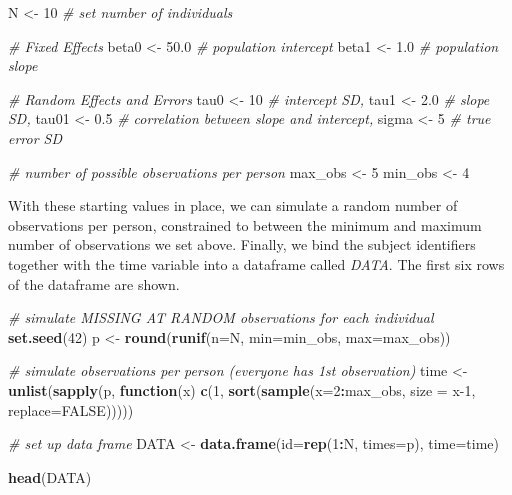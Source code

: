 \documentclass[
]{article}
\newenvironment{Shaded}{\begin{snugshade}}{\end{snugshade}}
\newcommand{\AttributeTok}[1]{\textcolor[rgb]{0.13,0.29,0.53}{#1}}
\newcommand{\CommentTok}[1]{\textcolor[rgb]{0.56,0.35,0.01}{\textit{#1}}}
\newcommand{\ConstantTok}[1]{\textcolor[rgb]{0.56,0.35,0.01}{#1}}
\newcommand{\ControlFlowTok}[1]{\textcolor[rgb]{0.13,0.29,0.53}{\textbf{#1}}}
\newcommand{\DecValTok}[1]{\textcolor[rgb]{0.00,0.00,0.81}{#1}}
\newcommand{\FloatTok}[1]{\textcolor[rgb]{0.00,0.00,0.81}{#1}}
\newcommand{\FunctionTok}[1]{\textcolor[rgb]{0.13,0.29,0.53}{\textbf{#1}}}
\newcommand{\NormalTok}[1]{#1}
\newcommand{\OtherTok}[1]{\textcolor[rgb]{0.56,0.35,0.01}{#1}}
\newcommand{\SpecialCharTok}[1]{\textcolor[rgb]{0.81,0.36,0.00}{\textbf{#1}}}
\begin{document}
\begin{Shaded}
\begin{Highlighting}[]
\NormalTok{N }\OtherTok{\textless{}{-}} \DecValTok{10} \CommentTok{\# set number of individuals}

\CommentTok{\# Fixed Effects}
\NormalTok{beta0 }\OtherTok{\textless{}{-}} \FloatTok{50.0} \CommentTok{\# population intercept }
\NormalTok{beta1 }\OtherTok{\textless{}{-}} \FloatTok{1.0}  \CommentTok{\# population slope}

\CommentTok{\# Random Effects and Errors}
\NormalTok{tau0  }\OtherTok{\textless{}{-}} \DecValTok{10} \CommentTok{\# intercept SD, }
\NormalTok{tau1  }\OtherTok{\textless{}{-}} \FloatTok{2.0} \CommentTok{\# slope SD, }
\NormalTok{tau01 }\OtherTok{\textless{}{-}} \FloatTok{0.5} \CommentTok{\# correlation between slope and intercept,}
\NormalTok{sigma }\OtherTok{\textless{}{-}} \DecValTok{5} \CommentTok{\# true error SD}


\CommentTok{\# number of possible observations per person}
\NormalTok{max\_obs }\OtherTok{\textless{}{-}} \DecValTok{5}
\NormalTok{min\_obs }\OtherTok{\textless{}{-}} \DecValTok{4}
\end{Highlighting}
\end{Shaded}

With these starting values in place, we can simulate a random number of
observations per person, constrained to between the minimum and maximum
number of observations we set above. Finally, we bind the subject
identifiers together with the time variable into a dataframe called
\emph{DATA}. The first six rows of the dataframe are shown.

\begin{Shaded}
\begin{Highlighting}[]
\CommentTok{\# simulate MISSING AT RANDOM observations for each individual}
\FunctionTok{set.seed}\NormalTok{(}\DecValTok{42}\NormalTok{)}
\NormalTok{p }\OtherTok{\textless{}{-}} \FunctionTok{round}\NormalTok{(}\FunctionTok{runif}\NormalTok{(}\AttributeTok{n=}\NormalTok{N, }\AttributeTok{min=}\NormalTok{min\_obs, }\AttributeTok{max=}\NormalTok{max\_obs))}

\CommentTok{\# simulate observations per person (everyone has 1st observation)}
\NormalTok{time }\OtherTok{\textless{}{-}} \FunctionTok{unlist}\NormalTok{(}\FunctionTok{sapply}\NormalTok{(p, }\ControlFlowTok{function}\NormalTok{(x) }\FunctionTok{c}\NormalTok{(}\DecValTok{1}\NormalTok{, }\FunctionTok{sort}\NormalTok{(}\FunctionTok{sample}\NormalTok{(}\AttributeTok{x=}\DecValTok{2}\SpecialCharTok{:}\NormalTok{max\_obs, }\AttributeTok{size =}\NormalTok{ x}\DecValTok{{-}1}\NormalTok{, }\AttributeTok{replace=}\ConstantTok{FALSE}\NormalTok{)))))}

\CommentTok{\# set up data frame}
\NormalTok{DATA }\OtherTok{\textless{}{-}} \FunctionTok{data.frame}\NormalTok{(}\AttributeTok{id=}\FunctionTok{rep}\NormalTok{(}\DecValTok{1}\SpecialCharTok{:}\NormalTok{N, }\AttributeTok{times=}\NormalTok{p), }\AttributeTok{time=}\NormalTok{time)}

\FunctionTok{head}\NormalTok{(DATA)}
\end{Highlighting}
\end{Shaded}
\end{document}
